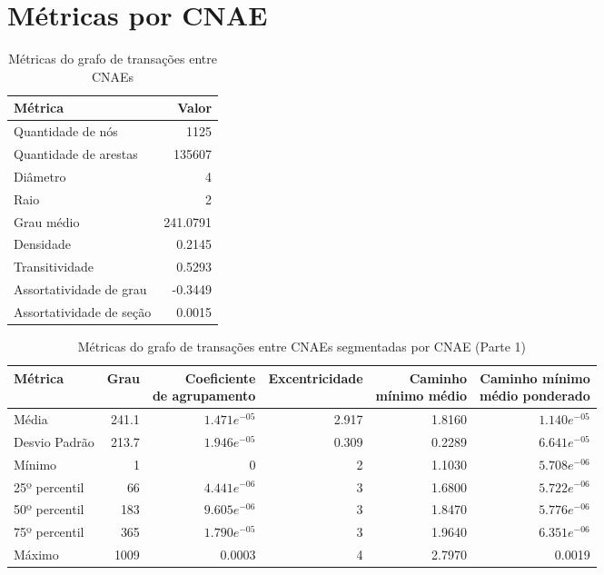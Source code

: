 \section{Métricas por CNAE}

\begin{table}[htb]
\centering
\caption{Métricas do grafo de transações entre CNAEs}
\label{tab:metricas-redes:grafo-por-cnae}
    \begin{tabular}{l|r}
    \toprule
    Métrica &  Valor \\
    \midrule
    Quantidade de nós         &   1125      \\
    Quantidade de arestas     & 135607      \\
    Diâmetro                  &      4      \\
    Raio                      &      2      \\
    Grau médio                &    241.0791 \\
    Densidade                 &      0.2145 \\
    Transitividade            &      0.5293 \\
    Assortatividade de grau   &     -0.3449 \\
    Assortatividade de seção &      0.0015 \\
    \bottomrule
    \end{tabular}
\fdadospesquisa
\end{table}

\begin{table}[htb]
\centering
\caption{Métricas do grafo de transações entre CNAEs segmentadas por CNAE (Parte 1)}
\label{tab:metricas-redes:grafo-por-cnae-especificas1}
\begin{tabular}{l|rrrrr}
\toprule
Métrica & Grau & \shortstack{Coeficiente\\de agrupamento} & Excentricidade & \shortstack{Caminho\\mínimo médio} & \shortstack{Caminho mínimo\\médio ponderado} \\
\midrule
Média         &  241.1 &   $1.471e^{-05}$ & 2.917 & 1.8160 & $1.140e^{-05}$ \\
Desvio Padrão &  213.7 &   $1.946e^{-05}$ & 0.309 & 0.2289 & $6.641e^{-05}$ \\
Mínimo        &    1   &                0 &     2 & 1.1030 & $5.708e^{-06}$ \\
25º percentil &   66   &   $4.441e^{-06}$ &     3 & 1.6800 & $5.722e^{-06}$ \\
50º percentil &  183   &   $9.605e^{-06}$ &     3 & 1.8470 & $5.776e^{-06}$ \\
75º percentil &  365   &   $1.790e^{-05}$ &     3 & 1.9640 & $6.351e^{-06}$ \\
Máximo        & 1009   &           0.0003 &     4 & 2.7970 &         0.0019 \\
\bottomrule
\end{tabular}
\fdadospesquisa
\end{table}

